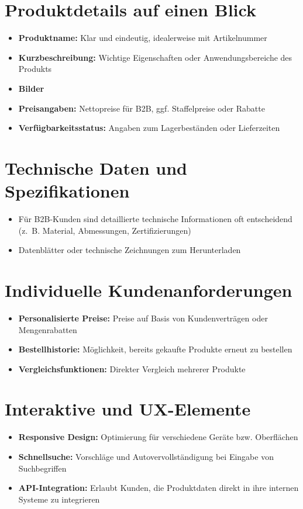 \documentclass[%
	ngerman,
	12pt,
	a4paper,
	oneside
]{scrbook}
\begin{document}
\section{Produktdetails auf einen Blick}
\begin{itemize}
	\item \textbf{Produktname:} Klar und eindeutig, idealerweise mit Artikelnummer
	\item \textbf{Kurzbeschreibung:} Wichtige Eigenschaften oder Anwendungsbereiche des Produkts
	\item \textbf{Bilder}
	\item \textbf{Preisangaben:} Nettopreise für B2B, ggf. Staffelpreise oder Rabatte
	\item \textbf{Verfügbarkeitsstatus:} Angaben zum Lagerbeständen oder Lieferzeiten
\end{itemize}
\section{Technische Daten und Spezifikationen}
\begin{itemize}
	\item Für B2B-Kunden sind detaillierte technische Informationen oft entscheidend (z.~B. Material, Abmessungen, Zertifizierungen)
	\item Datenblätter oder technische Zeichnungen zum Herunterladen
\end{itemize}
\section{Individuelle Kundenanforderungen}
\begin{itemize}
	\item \textbf{Personalisierte Preise:} Preise auf Basis von Kundenverträgen oder Mengenrabatten
	\item \textbf{Bestellhistorie:} Möglichkeit, bereits gekaufte Produkte erneut zu bestellen
	\item \textbf{Vergleichsfunktionen:} Direkter Vergleich mehrerer Produkte
\end{itemize}
\section{Interaktive und UX-Elemente}
\begin{itemize}
	\item \textbf{Responsive Design:} Optimierung für verschiedene Geräte bzw. Oberflächen
	\item \textbf{Schnellsuche:} Vorschläge und Autovervollständigung bei Eingabe von Suchbegriffen
	\item \textbf{API-Integration:} Erlaubt Kunden, die Produktdaten direkt in ihre internen Systeme zu integrieren
\end{itemize}
\end{document}
